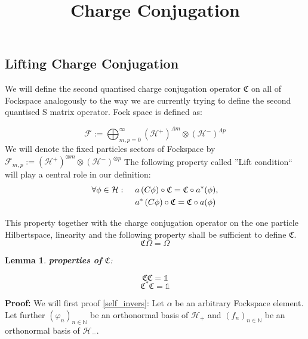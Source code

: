 \documentclass[a4paper,12pt]{article}
\newtheorem{lemma}{Lemma }
\begin{document}
\title{ Charge Conjugation}
%
%

\begin{center}
\section{ Lifting Charge Conjugation}
\end{center}

We will define the second quantised charge conjugation operator \(\mathfrak{C}\) on all of Fockspace analogously to the way we are currently trying to define the second quantised S matrix operator. Fock space is defined as:

\begin{equation}
\mathcal{F}:=\bigoplus_{m,p=0}^\infty \left(\mathcal{H}^+ \right)^{\Lambda m} \otimes \left(\mathcal{H}^- \right)^{\Lambda p}
\end{equation}
We will denote the fixed particles sectors of Fockspace by \(\mathcal{F}_{m,p}:= \left(\mathcal{H}^+ \right)^{\otimes m} \otimes \left(\mathcal{H}^- \right)^{\otimes p}\)
The following property called ''Lift condition`` will play a central role in our definition:%
\begin{equation}\label{lift_condition}
\begin{aligned}
\forall \phi\in \mathcal{H}: \hspace{0.5cm} &a\left( C \phi \right)  \circ \mathfrak{C}=\mathfrak{C} \circ a^*(\phi),\\
\hspace{0.5cm} &a^*\left( C \phi \right)  \circ \mathfrak{C}=\mathfrak{C} \circ a(\phi)
\end{aligned}
\end{equation}

This property together with the charge conjugation operator on the one particle Hilbertspace, linearity and the following property shall be sufficient to define \(\mathfrak{C}\).
\begin{equation}
\mathfrak{C}\Omega=\Omega
\end{equation}


\begin{lemma}\label{basic_properties}
{\bf properties of} \(\mathfrak{C}\):

\begin{equation}\label{self_invers}
\mathfrak{C} \mathfrak{C} = \mathds{1}
\end{equation}
\begin{equation}\label{unitarity}
\mathfrak{C}^* \mathfrak{C} = \mathds{1}
\end{equation}
\end{lemma}
{\bf Proof:}  We will first proof \eqref{self_invers}: Let \(\alpha\) be an arbitrary Fockspace element. Let further \((\varphi_n)_{n\in \mathbb{N}}\) be an orthonormal basis of \(\mathcal{H}_+\) and \((f_n)_{n\in \mathbb{N}}\) be an orthonormal basis of \(\mathcal{H}_-\).
\end{document}
